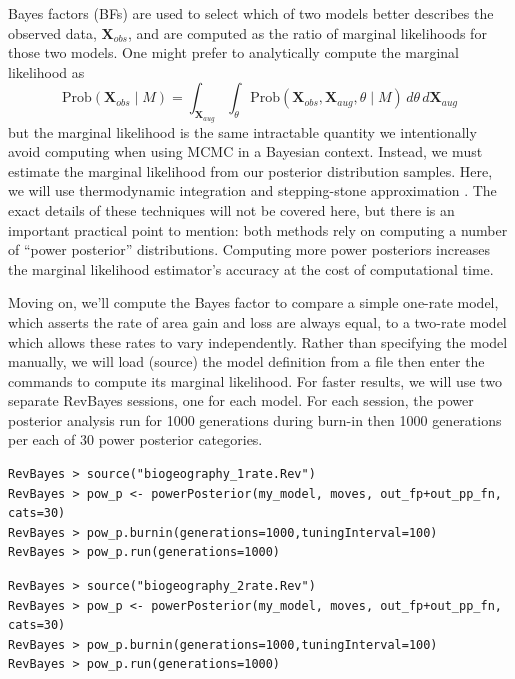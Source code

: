 \documentclass[11pt]{article}
\begin{document}
Bayes factors (BFs) are used to select which of two models better describes the observed data, $\mathbf{X}_{obs}$, and are computed as the ratio of marginal likelihoods for those two models.
One might prefer to analytically compute the marginal likelihood as 
\[
\text{Prob}(\mathbf{X}_{obs} \mid M) = \int_{\mathbf{X}_{aug}} \int_{\theta} \text{Prob}(\mathbf{X}_{obs}, \mathbf{X}_{aug}, \theta \mid M) \, d\theta \, d\mathbf{X}_{aug}
\]
but the marginal likelihood is the same intractable quantity we intentionally avoid computing when using MCMC in a Bayesian context.
Instead, we must estimate the marginal likelihood from our posterior distribution samples.
Here, we will use thermodynamic integration \citep{lartillot06} and stepping-stone approximation \citep{xie10}.
The exact details of these techniques will not be covered here, but there is an important practical point to mention: both methods rely on computing a number of ``power posterior'' distributions.
Computing more power posteriors increases the marginal likelihood estimator's accuracy at the cost of computational time.

Moving on, we'll compute the Bayes factor to compare a simple one-rate model, which asserts the rate of area gain and loss are always equal, to a two-rate model which allows these rates to vary independently.
Rather than specifying the model manually, we will load (source) the model definition from a file then enter the commands to compute its marginal likelihood.
For faster results, we will use two separate RevBayes sessions, one for each model.
For each session, the power posterior analysis run for 1000 generations during burn-in then 1000 generations per each of 30 power posterior categories.

\begin{snugshade}
\begin{lstlisting}
RevBayes > source("biogeography_1rate.Rev")
RevBayes > pow_p <- powerPosterior(my_model, moves, out_fp+out_pp_fn, cats=30) 
RevBayes > pow_p.burnin(generations=1000,tuningInterval=100)
RevBayes > pow_p.run(generations=1000)
\end{lstlisting}
\end{snugshade}

\begin{snugshade}
\begin{lstlisting}
RevBayes > source("biogeography_2rate.Rev")
RevBayes > pow_p <- powerPosterior(my_model, moves, out_fp+out_pp_fn, cats=30) 
RevBayes > pow_p.burnin(generations=1000,tuningInterval=100)
RevBayes > pow_p.run(generations=1000)  
\end{lstlisting}
\end{snugshade}
\end{document}
